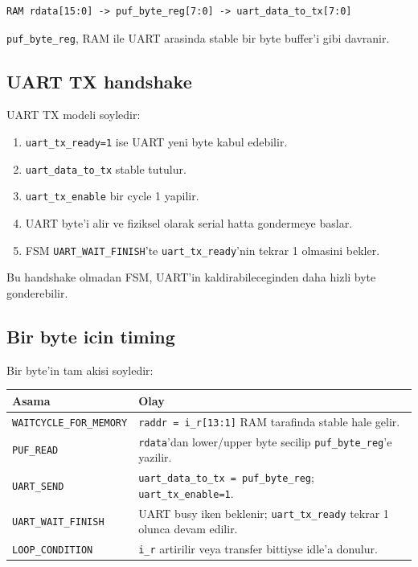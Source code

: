 \documentclass[11pt,a4paper]{article}
\begin{document}
\begin{lstlisting}[style=verilogstyle]
RAM rdata[15:0] -> puf_byte_reg[7:0] -> uart_data_to_tx[7:0]
\end{lstlisting}

\texttt{puf\_byte\_reg}, RAM ile UART arasinda stable bir byte buffer'i gibi davranir.

\subsection{UART TX handshake}
UART TX modeli soyledir:
\begin{enumerate}
  \item \texttt{uart\_tx\_ready=1} ise UART yeni byte kabul edebilir.
  \item \texttt{uart\_data\_to\_tx} stable tutulur.
  \item \texttt{uart\_tx\_enable} bir cycle 1 yapilir.
  \item UART byte'i alir ve fiziksel olarak serial hatta gondermeye baslar.
  \item FSM \texttt{UART\_WAIT\_FINISH}'te \texttt{uart\_tx\_ready}'nin tekrar 1 olmasini bekler.
\end{enumerate}

Bu handshake olmadan FSM, UART'in kaldirabileceginden daha hizli byte gonderebilir.

\subsection{Bir byte icin timing}
Bir byte'in tam akisi soyledir:

\begin{longtable}{p{3cm}p{11.4cm}}
\toprule
Asama & Olay \\
\midrule
\endhead
\texttt{WAITCYCLE\_FOR\_MEMORY} & \texttt{raddr = i\_r[13:1]} RAM tarafinda stable hale gelir. \\
\texttt{PUF\_READ} & \texttt{rdata}'dan lower/upper byte secilip \texttt{puf\_byte\_reg}'e yazilir. \\
\texttt{UART\_SEND} & \texttt{uart\_data\_to\_tx = puf\_byte\_reg}; \texttt{uart\_tx\_enable=1}. \\
\texttt{UART\_WAIT\_FINISH} & UART busy iken beklenir; \texttt{uart\_tx\_ready} tekrar 1 olunca devam edilir. \\
\texttt{LOOP\_CONDITION} & \texttt{i\_r} artirilir veya transfer bittiyse idle'a donulur. \\
\bottomrule
\end{longtable}
\end{document}
